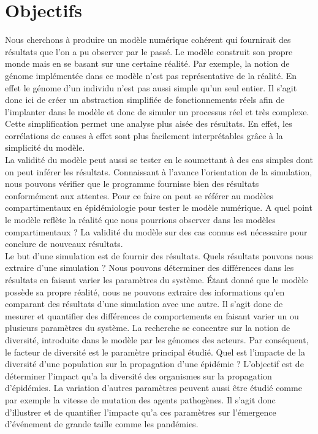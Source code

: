 \chapter{Objectifs} \label{ch:objectifs}

Nous cherchons à produire un modèle numérique cohérent qui fournirait des résultats que l'on a pu observer par le passé. Le modèle construit son propre monde mais en se basant sur une certaine réalité. Par exemple, la notion de génome implémentée dans ce modèle n'est pas représentative de la réalité. En effet le génome d'un individu n'est pas aussi simple qu'un seul entier. Il s'agit donc ici de créer un abstraction simplifiée de fonctionnements réels afin de l'implanter dans le modèle et donc de simuler un processus réel et très complexe. Cette simplification permet une analyse plus aisée des résultats. En effet, les corrélations de causes à effet sont plus facilement interprétables grâce à la simplicité du modèle.\\

La validité du modèle peut aussi se tester en le soumettant à des cas simples dont on peut inférer les résultats. Connaissant à l'avance l'orientation de la simulation, nous pouvons vérifier que le programme fournisse bien des résultats conformément aux attentes. Pour ce faire on peut se référer au modèles compartimentaux en épidémiologie pour tester le modèle numérique. A quel point le modèle reflète la réalité que nous pourrions observer dans les modèles compartimentaux ? La validité du modèle sur des cas connus est nécessaire pour conclure de nouveaux résultats. \\

Le but d'une simulation est de fournir des résultats. Quels résultats pouvons nous extraire d'une simulation ? Nous pouvons déterminer des différences dans les résultats en faisant varier les paramètres du système. Étant donné que le modèle possède sa propre réalité, nous ne pouvons extraire des informations qu'en comparant des résultats d'une simulation avec une autre. Il s'agit donc de mesurer et quantifier des différences de comportements en faisant varier un ou plusieurs paramètres du système. La recherche se concentre sur la notion de diversité, introduite dans le modèle par les génomes des acteurs. Par conséquent, le facteur de diversité est le paramètre principal étudié. Quel est l'impacte de la diversité d'une population sur la propagation d'une épidémie ?  L'objectif est de déterminer l'impact qu'a la diversité des organismes sur la propagation d'épidémies. La variation d'autres paramètres peuvent aussi être étudié comme par exemple la vitesse de mutation des agents pathogènes. Il s'agit donc d'illustrer et de quantifier l'impacte qu'a ces paramètres sur l'émergence d'événement de grande taille comme les pandémies.\\

